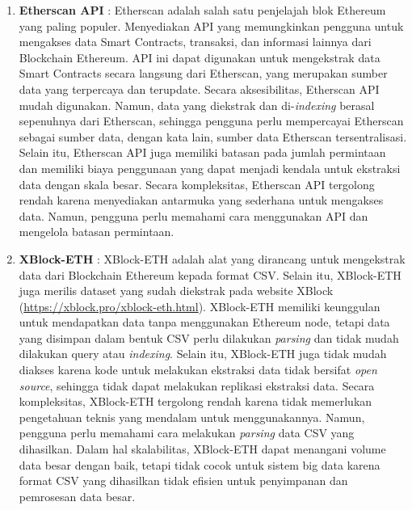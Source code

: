 \begin{enumerate}
    \item \textbf{Etherscan API} \parencite{etherscan2024}: Etherscan adalah salah satu penjelajah blok Ethereum yang paling populer. Menyediakan API yang memungkinkan pengguna untuk mengakses data Smart Contracts, transaksi, dan informasi lainnya dari Blockchain Ethereum. API ini dapat digunakan untuk mengekstrak data Smart Contracts secara langsung dari Etherscan, yang merupakan sumber data yang terpercaya dan terupdate. Secara aksesibilitas, Etherscan API mudah digunakan. Namun, data yang diekstrak dan di-\textit{indexing} berasal sepenuhnya dari Etherscan, sehingga pengguna perlu mempercayai Etherscan sebagai sumber data, dengan kata lain, sumber data Etherscan tersentralisasi. Selain itu, Etherscan API juga memiliki batasan pada jumlah permintaan dan memiliki biaya penggunaan yang dapat menjadi kendala untuk ekstraksi data dengan skala besar. Secara kompleksitas, Etherscan API tergolong rendah karena menyediakan antarmuka yang sederhana untuk mengakses data. Namun, pengguna perlu memahami cara menggunakan API dan mengelola batasan permintaan.
    
    \item \textbf{XBlock-ETH} \parencite{zheng2020xblock}: XBlock-ETH adalah alat yang dirancang untuk mengekstrak data dari Blockchain Ethereum kepada format CSV. Selain itu, XBlock-ETH juga merilis dataset yang sudah diekstrak pada website XBlock (\url{https://xblock.pro/xblock-eth.html}). XBlock-ETH memiliki keunggulan untuk mendapatkan data tanpa menggunakan Ethereum node, tetapi data yang disimpan dalam bentuk CSV perlu dilakukan \textit{parsing} dan tidak mudah dilakukan query atau \textit{indexing}. Selain itu, XBlock-ETH juga tidak mudah diakses karena kode untuk melakukan ekstraksi data tidak bersifat \textit{open source}, sehingga tidak dapat melakukan replikasi ekstraksi data. Secara kompleksitas, XBlock-ETH tergolong rendah karena tidak memerlukan pengetahuan teknis yang mendalam untuk menggunakannya. Namun, pengguna perlu memahami cara melakukan \textit{parsing} data CSV yang dihasilkan. Dalam hal skalabilitas, XBlock-ETH dapat menangani volume data besar dengan baik, tetapi tidak cocok untuk sistem big data karena format CSV yang dihasilkan tidak efisien untuk penyimpanan dan pemrosesan data besar.
    

\end{enumerate}
